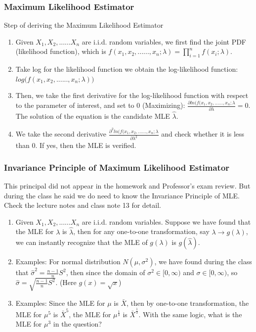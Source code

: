 \documentclass{beamer}
\begin{document}
\begin{frame}
\frametitle{Maximum Likelihood Estimator}

Step of deriving the Maximum Likelihood Estimator

\begin{enumerate}
\item Given $X_1, X_2,......X_n$ are i.i.d. random variables, we first find the joint PDF (likelihood function), which is $f(x_1, x_2,......, x_n;\lambda) = \prod_{i=1}^n f(x_i;\lambda)$. 

\item Take log for the likelihood function we obtain the log-likelihood function: $log\Big(f(x_1, x_2,......, x_n;\lambda)\Big)$

\item Then, we take the first derivative for the log-likelihood function with respect to the parameter of interest, and set to 0 (Maximizing): $\frac{\partial ln(f(x_1,x_2,......,x_n; \lambda}{\partial \lambda} = 0$. The solution of the equation is the candidate MLE $\hat \lambda$.

\item We take the second derivative $\frac{\partial^2 ln(f(x_1,x_2,......,x_n; \lambda}{\partial \lambda^2}$ and check whether it is less than 0. If yes, then the MLE is verified.

\end{enumerate}
\end{frame}


\begin{frame}
\frametitle{Invariance Principle of Maximum Likelihood Estimator}

This principal did not appear in the homework and Professor's exam review. But during the class he said we do need to know the Invariance Principle of MLE. Check the lecture notes and class note 13 for detail.

\begin{enumerate}
\item Given $X_1, X_2,......X_n$ are i.i.d. random variables. Suppose we have found that the MLE for $\lambda$ is $\hat \lambda$, then for any one-to-one transformation, say $\lambda \rightarrow g(\lambda)$, we can instantly recognize that the MLE of $g(\lambda)$ is $g(\hat \lambda)$.

\item Examples: For normal distribution $N(\mu,\sigma^2)$, we have found during the class that $\hat \sigma^2 = \frac{n-1}{n}S^2$, then since the domain of $\sigma^2 \in [0,\infty)$ and $\sigma \in [0,\infty)$, so $\hat \sigma = \sqrt{\frac{n-1}{n}S^2}$. (Here $g(x) = \sqrt{x}$)

\item Examples: Since the MLE for $\mu$ is $\bar X$, then by one-to-one transformation, the MLE for $\mu^5$ is $\bar X^5$, the MLE for $\mu^{\frac{1}{3}}$ is $\bar X^{\frac{1}{3}}$. With the same logic, what is the MLE for $\mu^3$ in the question? 

\end{enumerate}
\end{frame}
\end{document}
